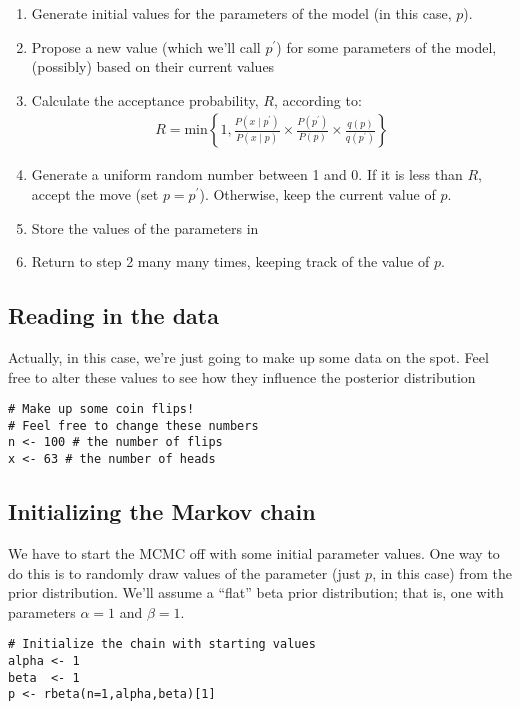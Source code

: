 \begin{enumerate}
	\item Generate initial values for the parameters of the model (in this case, $p$).
	\item Propose a new value (which we'll call $p^\prime$) for some parameters of the model, (possibly) based on their current values 
	\item Calculate the acceptance probability, $R$, according to:
	\begin{align*}
		R = \text{min}\left\{1, \frac{P(x \mid p^\prime)}{P(x \mid p)} \times \frac{P(p^\prime)}{P(p)} \times \frac{q(p)}{q(p^\prime)} \right\}
	\end{align*}
	\item Generate a uniform random number between 1 and 0. If it is less than $R$, accept the move (set $p = p^\prime$). Otherwise, keep the current value of $p$.
	\item Store the values of the parameters in
	\item Return to step 2 many many times, keeping track of the value of $p$.
\end{enumerate}

\subsection{Reading in the data}
Actually, in this case, we're just going to make up some data on the spot.
Feel free to alter these values to see how they influence the posterior distribution
{\tt \begin{snugshade*}
\begin{lstlisting}    
# Make up some coin flips!
# Feel free to change these numbers
n <- 100 # the number of flips
x <- 63	# the number of heads
\end{lstlisting}
\end{snugshade*}}

\subsection{Initializing the Markov chain}
We have to start the MCMC off with some initial parameter values.
One way to do this is to randomly draw values of the parameter (just $p$, in this case) from the prior distribution.
We'll assume a ``flat'' beta prior distribution; that is, one with parameters $\alpha = 1$ and $\beta = 1$.
{\tt \begin{snugshade*}
\begin{lstlisting}
# Initialize the chain with starting values
alpha <- 1
beta  <- 1
p <- rbeta(n=1,alpha,beta)[1]
\end{lstlisting}
\end{snugshade*}}


